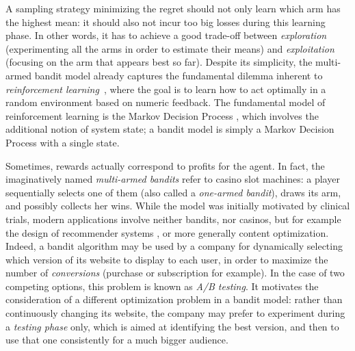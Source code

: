 \documentclass[proc]{edpsmath}
\begin{document}
	A sampling strategy minimizing  the regret should not only learn which arm has the highest mean: it should also not incur too big losses during this learning phase. In other words, it has to achieve a good trade-off between \emph{exploration} (experimenting all the arms in order to estimate their means) and \emph{exploitation} (focusing on the arm that appears best so far). Despite its simplicity, the multi-armed bandit model already captures the fundamental dilemma inherent to \emph{reinforcement learning}~\cite{SuttonBarto98}, where the goal is to learn how to act optimally in a random environment based on numeric feedback. The fundamental model of reinforcement learning is the Markov Decision Process \cite{Puterman94MDP}, which involves the additional notion of system state; a bandit model is simply a Markov Decision Process with a single state. 
	
	Sometimes, rewards actually correspond to profits for the agent. In fact, the imaginatively named \emph{multi-armed bandits} refer to casino slot machines: a player sequentially selects one of them (also called a \emph{one-armed bandit}), draws its arm, and possibly collects her wins. While the model was initially motivated by clinical trials, modern applications involve neither bandits, nor casinos, but for example the design of recommender systems \cite{LinUCB11}, or more generally content optimization. Indeed, a bandit algorithm may be used by a company for dynamically selecting which version of its website to display to each  user, in order to maximize the number of \emph{conversions} (purchase or subscription for example). In the case of two competing options, this problem is known as  \emph{A/B testing}. It motivates the consideration of a different optimization problem in a bandit model: rather than continuously changing its website, the company may prefer to experiment during a \emph{testing phase} only, which is aimed at identifying the best version, and then to use that one consistently for a much bigger audience.
	
\end{document}
